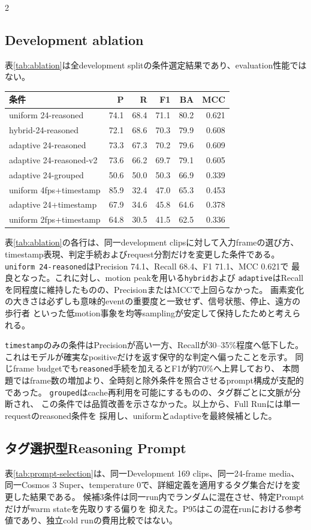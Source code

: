 \documentclass[9pt,a4paper]{extarticle}
\begin{document}
\begin{multicols}{2}
\subsection{Development ablation}
表\ref{tab:ablation}は全development splitの条件選定結果であり、evaluation性能ではない。
\begin{center}
\centering
{}
\label{tab:ablation}
\scriptsize
\begin{tabular}{lrrrrr}
\toprule
条件 & P & R & F1 & BA & MCC\\
\midrule
uniform 24-reasoned & 74.1 & 68.4 & 71.1 & 80.2 & 0.621 \\
hybrid-24-reasoned & 72.1 & 68.6 & 70.3 & 79.9 & 0.608 \\
adaptive 24-reasoned & 73.3 & 67.3 & 70.2 & 79.6 & 0.609 \\
adaptive 24-reasoned-v2 & 73.6 & 66.2 & 69.7 & 79.1 & 0.605 \\
adaptive 24-grouped & 50.6 & 50.0 & 50.3 & 66.9 & 0.339 \\
uniform 4fps+timestamp & 85.9 & 32.4 & 47.0 & 65.3 & 0.453 \\
adaptive 24+timestamp & 67.9 & 34.6 & 45.8 & 64.6 & 0.378 \\
uniform 2fps+timestamp & 64.8 & 30.5 & 41.5 & 62.5 & 0.336 \\
\bottomrule
\end{tabular}
\end{center}

表\ref{tab:ablation}の各行は、同一development clipsに対して入力frameの選び方、
timestamp表現、判定手続およびrequest分割だけを変更した条件である。
\texttt{uniform 24-reasoned}はPrecision 74.1、Recall 68.4、F1 71.1、MCC 0.621で
最良となった。これに対し、motion peakを用いる\texttt{hybrid}および
\texttt{adaptive}はRecallを同程度に維持したものの、PrecisionまたはMCCで上回らなかった。
画素変化の大きさは必ずしも意味的eventの重要度と一致せず、信号状態、停止、遠方の歩行者
といった低motion事象を均等samplingが安定して保持したためと考えられる。

\texttt{timestamp}のみの条件はPrecisionが高い一方、Recallが30--35\%程度へ低下した。
これはモデルが確実なpositiveだけを返す保守的な判定へ偏ったことを示す。
同じframe budgetでも\texttt{reasoned}手続を加えるとF1が約70\%へ上昇しており、
本問題ではframe数の増加より、全時刻と除外条件を照合させるprompt構成が支配的であった。
\texttt{grouped}はcache再利用を可能にするものの、タグ群ごとに文脈が分断され、
この条件では品質改善を示さなかった。以上から、Full Runには単一requestのreasoned条件を
採用し、uniformとadaptiveを最終候補とした。

\subsection{タグ選択型Reasoning Prompt}
表\ref{tab:prompt-selection}は、同一Development 169 clips、同一24-frame media、
同一Cosmos 3 Super、temperature 0で、詳細定義を適用するタグ集合だけを変更した結果である。
候補3条件は同一run内でランダムに混在させ、特定Promptだけがwarm stateを先取りする偏りを
抑えた。P95はこの混在runにおける参考値であり、独立cold runの費用比較ではない。
\end{multicols}
\end{document}
